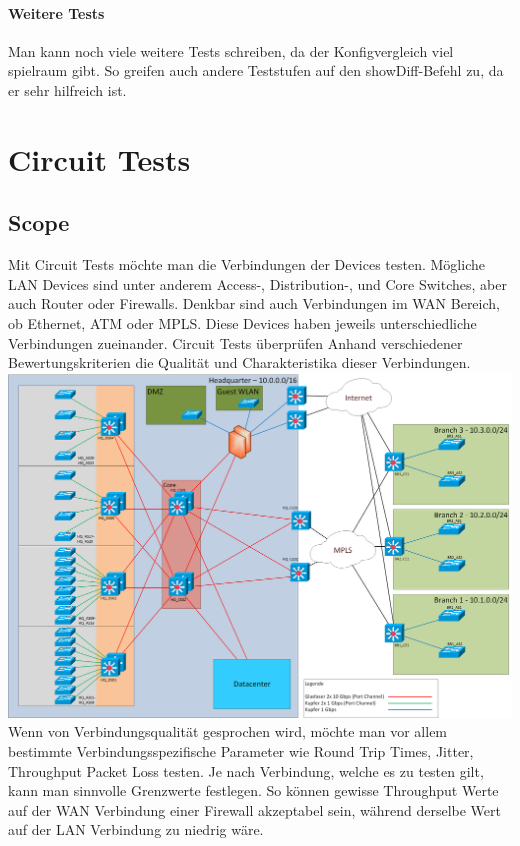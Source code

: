 \documentclass[a4,12pt]{scrartcl}
\begin{document}
\paragraph{Weitere Tests}\newline
Man kann noch viele weitere Tests schreiben, da der Konfigvergleich viel spielraum gibt. So greifen auch andere Teststufen auf den showDiff-Befehl zu, da er sehr hilfreich ist. 
\newpage
\section{Circuit Tests}
\subsection{Scope}
Mit Circuit Tests möchte man die Verbindungen der Devices testen. Mögliche LAN Devices sind unter anderem Access-, Distribution-, und Core Switches, aber auch Router oder Firewalls. Denkbar sind auch Verbindungen im WAN Bereich, ob Ethernet, ATM oder MPLS. Diese Devices haben jeweils unterschiedliche Verbindungen zueinander. Circuit Tests überprüfen Anhand verschiedener Bewertungskriterien die Qualität und Charakteristika dieser Verbindungen.\\

\includegraphics[width=1\textwidth]{figures/Netzwerk_physisch.png}\\

\noindent Wenn von Verbindungsqualität gesprochen wird, möchte man vor allem bestimmte Verbindungsspezifische Parameter wie Round Trip Times, Jitter, Throughput Packet Loss testen. Je nach Verbindung, welche es zu testen gilt, kann man sinnvolle Grenzwerte festlegen. So können gewisse Throughput Werte auf der WAN Verbindung einer Firewall akzeptabel sein, während derselbe Wert auf der LAN Verbindung zu niedrig wäre.\\
\end{document}
